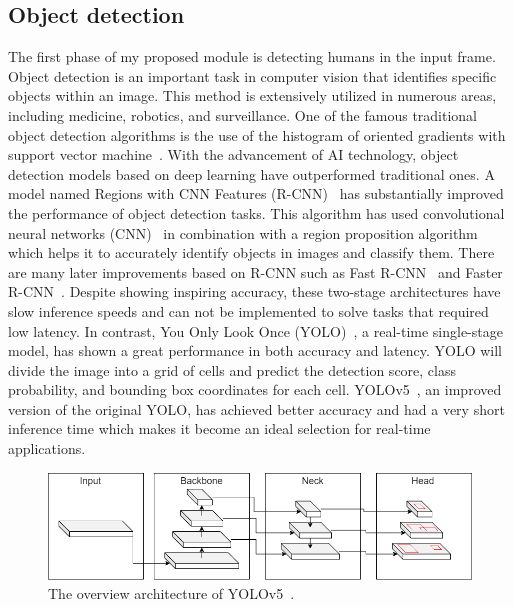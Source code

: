 \documentclass[../main.tex]{subfiles}
\begin{document}
\subsection{Object detection}
\label{sec:objdect}
The first phase of my proposed module is detecting humans in the input frame. Object detection is an important task in computer vision that identifies specific objects within an image. This method is extensively utilized in numerous areas, including medicine, robotics, and surveillance. One of the famous traditional object detection algorithms is the use of the histogram of oriented gradients with support vector machine~\cite{pang2011efficient}. With the advancement of AI technology, object detection models based on deep learning have outperformed traditional ones. A model named Regions with CNN Features (R-CNN)~\cite{girshick2014rich} has substantially improved the performance of object detection tasks. This algorithm has used convolutional neural networks (CNN)~\cite{o2015introduction} in combination with a region proposition algorithm which helps it to accurately identify objects in images and classify them. There are many later improvements based on R-CNN such as Fast R-CNN~\cite{girshick2015fast} and Faster R-CNN~\cite{ren2015faster}. Despite showing inspiring accuracy, these two-stage architectures have slow inference speeds and can not be implemented to solve tasks that required low latency. In contrast, You Only Look Once (YOLO)~\cite{redmon2016you}, a real-time single-stage model, has shown a great performance in both accuracy and latency. YOLO will divide the image into a grid of cells and predict the detection score, class probability, and bounding box coordinates for each cell. YOLOv5~\cite{glenn_jocher_2022_7347926}, an improved version of the original YOLO,  has achieved better accuracy and had a very short inference time which makes it become an ideal selection for real-time applications.

\begin{figure}[h!]
\centering
\includegraphics[width=\linewidth]{Figure/yolov5_overview.png}
\caption{The overview architecture of YOLOv5~\cite{glenn_jocher_2022_7347926}.}
\label{fig:yolov5}
\end{figure}
\end{document}
